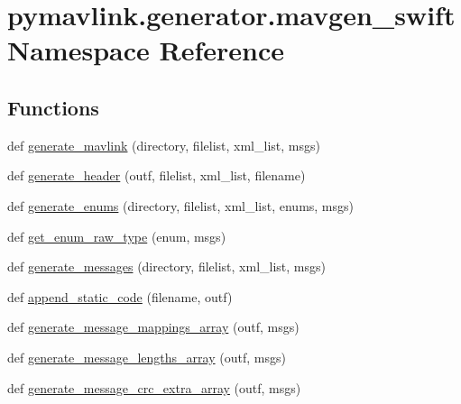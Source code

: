 \hypertarget{namespacepymavlink_1_1generator_1_1mavgen__swift}{}\section{pymavlink.\+generator.\+mavgen\+\_\+swift Namespace Reference}
\label{namespacepymavlink_1_1generator_1_1mavgen__swift}
\subsection*{Functions}
\begin{DoxyCompactItemize}
\item 
def \mbox{\hyperlink{namespacepymavlink_1_1generator_1_1mavgen__swift_af3cee7a3866c8d6309e4dfc23284aa08}{generate\+\_\+mavlink}} (directory, filelist, xml\+\_\+list, msgs)
\item 
def \mbox{\hyperlink{namespacepymavlink_1_1generator_1_1mavgen__swift_af86520c2c9b71b0133a82512d41f7b89}{generate\+\_\+header}} (outf, filelist, xml\+\_\+list, filename)
\item 
def \mbox{\hyperlink{namespacepymavlink_1_1generator_1_1mavgen__swift_a5603cdc6a0d7d2a8610a00132cc8cce5}{generate\+\_\+enums}} (directory, filelist, xml\+\_\+list, enums, msgs)
\item 
def \mbox{\hyperlink{namespacepymavlink_1_1generator_1_1mavgen__swift_afb9a96a35873d4a61daddaeac5c6a853}{get\+\_\+enum\+\_\+raw\+\_\+type}} (enum, msgs)
\item 
def \mbox{\hyperlink{namespacepymavlink_1_1generator_1_1mavgen__swift_a68339c0dfb0acc49c8dbfa99be213de0}{generate\+\_\+messages}} (directory, filelist, xml\+\_\+list, msgs)
\item 
def \mbox{\hyperlink{namespacepymavlink_1_1generator_1_1mavgen__swift_a44b1af0ce3b6338825d40002eb8dd76a}{append\+\_\+static\+\_\+code}} (filename, outf)
\item 
def \mbox{\hyperlink{namespacepymavlink_1_1generator_1_1mavgen__swift_a905071cf7748346eb9e0c8fccde6405f}{generate\+\_\+message\+\_\+mappings\+\_\+array}} (outf, msgs)
\item 
def \mbox{\hyperlink{namespacepymavlink_1_1generator_1_1mavgen__swift_ac76b28b77a9b6d1040ac2dacba539420}{generate\+\_\+message\+\_\+lengths\+\_\+array}} (outf, msgs)
\item 
def \mbox{\hyperlink{namespacepymavlink_1_1generator_1_1mavgen__swift_a85b6d1f85489a4db64118a6ee05004dc}{generate\+\_\+message\+\_\+crc\+\_\+extra\+\_\+array}} (outf, msgs)

\end{DoxyCompactItemize}
